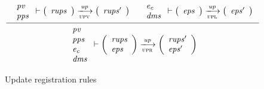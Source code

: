 \begin{figure}[htb]
  \begin{equation}
    \label{eq:rule:up-registration}
    \inference
    {
      {
        \begin{array}{l}
          \var{pv}\\
          \var{pps}
        \end{array}
      }
      \vdash
      {
        \left(
          \begin{array}{l}
            \var{rups}\\
          \end{array}
        \right)
      }
      \trans{upv}{\var{up}}
      {
        \left(
          \begin{array}{l}
            \var{rups'}\\
          \end{array}
        \right)
      }
      &
      {\begin{array}{l}
          \var{e_c}\\
          \var{dms}
        \end{array}
      }
      \vdash
      {
        \left(
          \begin{array}{l}
            \var{eps}
          \end{array}
        \right)
      }
      \trans{upl}{\var{up}}
      {
        \left(
          \begin{array}{l}
            \var{eps'}
          \end{array}
        \right)
      }
    }
    {
      {
        \begin{array}{l}
          \var{pv}\\
          \var{pps}\\
          \var{e_c}\\
          \var{dms}
        \end{array}
      }
      \vdash
      {
        \left(
          \begin{array}{l}
            \var{rups}\\
            \var{eps}
          \end{array}
        \right)
      }
      \trans{upr}{\var{up}}
      {
        \left(
          \begin{array}{l}
            \var{rups'}\\
            \var{eps'}
          \end{array}
        \right)
      }
    }
  \end{equation}
  \caption{Update registration rules}
  \label{fig:rules:up-registration}
\end{figure}

